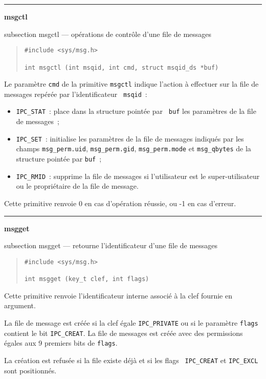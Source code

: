 \documentclass [twoside] {report}
\newcommand {\primitive} [1]
    {
	{\large \bf #1}
	\addcontentsline {toc} {subsection} {#1}
    }
\newcommand {\separation}
    {
	\vspace {7mm}
	\nopagebreak
	\hrule
    }
\begin{document}
\separation
\primitive {msgctl} --- opérations de contrôle d'une file de messages

\begin {quote}
\begin {verbatim}
#include <sys/msg.h>

int msgctl (int msqid, int cmd, struct msqid_ds *buf)
\end{verbatim}
\end {quote}

Le paramètre {\tt cmd} de la primitive {\tt msgctl} indique l'action à
effectuer sur la file de messages repérée par l'identificateur {\tt
msqid}~:

\begin {itemize}
    \item {\tt IPC\_STAT}~: place dans la structure pointée par {\tt
	buf} les paramètres de la file de messages~;
    \item {\tt IPC\_SET}~: initialise les paramètres de la file de
	messages indiqués par les champs {\tt msg\_perm.uid},
	{\tt msg\_perm.gid}, {\tt msg\_perm.mode} et {\tt msg\_qbytes}
	de la structure pointée par {\tt buf}~;
    \item {\tt IPC\_RMID}~: supprime la file de messages si
	l'utilisateur est le super-utilisateur ou le propriétaire de
	la file de message.
\end {itemize}

Cette primitive renvoie 0 en cas d'opération
réussie, ou -1 en cas d'erreur.


\separation
\primitive {msgget} --- retourne l'identificateur d'une file de messages

\begin {quote}
\begin {verbatim}
#include <sys/msg.h>

int msgget (key_t clef, int flags)
\end{verbatim}
\end {quote}

Cette primitive renvoie l'identificateur interne associé à la clef
fournie en argument.

La file de message est créée si la clef égale {\tt IPC\_PRIVATE} ou si
le paramètre {\tt flags} contient le bit {\tt IPC\_CREAT}.  La file de
messages est créée avec des permissions égales aux 9 premiers bits de
{\tt flags}.

La création est refusée si la file existe déjà et si les flags {\tt
IPC\_CREAT} et {\tt IPC\_EXCL} sont positionnés.
\end{document}
